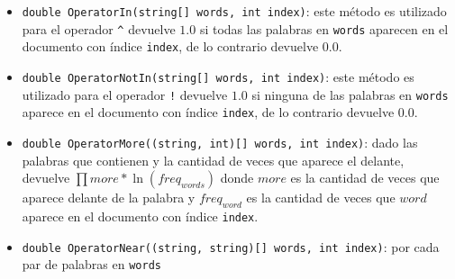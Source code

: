 \documentclass{report}
\begin{document}
\begin{itemize}
	\item {\tt double OperatorIn(string[] words, int index)}: este m\'etodo es utilizado para el operador {\tt \^{}} devuelve $1.0$ si todas las palabras en {\tt words} 
	aparecen en el documento con \'indice {\tt index}, de lo contrario devuelve $0.0$.
	\item {\tt double OperatorNotIn(string[] words, int index)}: este m\'etodo es utilizado para el operador {\tt !} devuelve $1.0$ si ninguna de las palabras en {\tt words} 
	aparece en el documento con \'indice {\tt index}, de lo contrario devuelve $0.0$.
	\item {\tt double OperatorMore((string, int)[] words, int index)}: dado las palabras que contienen {\tt *} y la cantidad de veces que aparece el {\tt *} delante, devuelve $\prod more * \ln(freq_{words})$ donde $more$ es la cantidad de veces que {\tt *} aparece delante de la palabra y $freq_{word}$ es la cantidad de veces que $word$ aparece en el documento con \'indice {\tt index}.
	\item {\tt double OperatorNear((string, string)[] words, int index)}: por cada par de palabras en {\tt words} 
\end{itemize}
\end{document}
